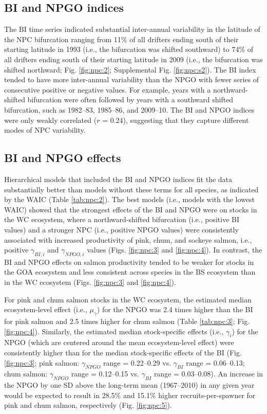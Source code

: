 \subsection{BI and NPGO indices}

The BI time series indicated substantial inter-annual variability in the
latitude of the NPC bifurcation ranging from 11\% of all drifters ending south
of their starting latitude in 1993 (i.e., the bifurcation was shifted southward)
to 74\% of all drifters ending south of their starting latitude in 2009 (i.e.,
the bifurcation was shifted northward; Fig. \ref{fig:npc:2}; Supplemental Fig.
\ref{fig:npc:s2}). The BI index tended to have more inter-annual variability than
the NPGO with fewer series of consecutive positive or negative values. For
example, years with a northward-shifted bifurcation were often followed by years
with a southward shifted bifurcation, such as 1982--83, 1985--86, and 2009--10.
The BI and NPGO indices were only weakly correlated (\(r\) = 0.24), suggesting
that they capture different modes of NPC variability.


\subsection{BI and NPGO effects}

Hierarchical models that included the BI and NPGO indices fit the data
substantially better than models without these terms for all species, as
indicated by the WAIC (Table \ref{tab:npc:2}). The best models (i.e., models
with the lowest WAIC) showed that the strongest effects of the BI and NPGO were
on stocks in the WC ecosystem, where a northward-shifted bifurcation (i.e.,
positive BI values) and a stronger NPC (i.e., positive NPGO values) were
consistently associated with increased productivity of pink, chum, and sockeye
salmon, i.e., positive \(\gamma_{BI,i}\) and \(\gamma_{NPGO,i}\) values (Figs.
\ref{fig:npc:3} and \ref{fig:npc:4}). In contrast, the BI and NPGO effects on
salmon productivity tended to be weaker for stocks in the GOA ecosystem and less
consistent across species in the BS ecosystem than in the WC ecosystem (Figs.
\ref{fig:npc:3} and \ref{fig:npc:4}).

For pink and chum salmon stocks in the WC ecosystem, the estimated median
ecosystem-level effect (i.e., \(\mu_{\gamma}\)) for the NPGO was 2.4 times
higher than the BI for pink salmon and 2.5 times higher for chum salmon (Table
\ref{tab:npc:3}; Fig. \ref{fig:npc:4}). Similarly, the estimated median
stock-specific effects (i.e., \(\gamma_i\)) for the NPGO (which are centered
around the mean ecosystem-level effect) were consistently higher than for the
median stock-specific effects of the BI (Fig. \ref{fig:npc:3}; pink salmon:
\(\gamma_{NPGO}\) range = 0.22--0.29 vs. \(\gamma_{BI}\) range = 0.06--0.13;
chum salmon: \(\gamma_{NPGO}\) range = 0.12--0.15 vs. \(\gamma_{BI}\) range =
0.03--0.08). An increase in the NPGO by one SD above the long-term mean
(1967--2010) in any given year would be expected to result in 28.5\% and 15.1\%
higher recruits-per-spawner for pink and chum salmon, respectively (Fig.
\ref{fig:npc:5}).

